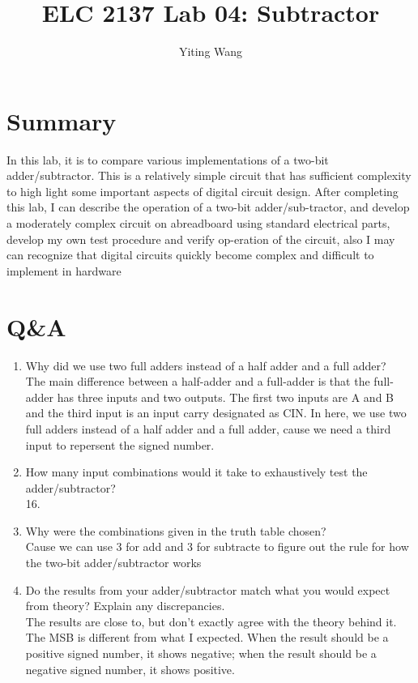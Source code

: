 \documentclass[11pt]{article}
\begin{document}
\title{ELC 2137 Lab 04: Subtractor}
\author{Yiting Wang}

\maketitle


\section*{Summary}

	In this lab, it is to compare various implementations of a two-bit adder/subtractor. This is a relatively simple circuit that has sufficient complexity to high light some important aspects of digital circuit design. After completing this lab, I can describe the operation of a two-bit adder/sub-tractor, and develop a moderately complex circuit on abreadboard using standard electrical parts, develop my own test procedure and verify op-eration of the circuit, also I may can recognize that digital circuits quickly become complex and difficult to implement in hardware



\section*{Q\&A}

	\begin{enumerate}
		\item Why did we use two full adders instead of a half adder and a full adder?\\
			The main difference between a half-adder and a full-adder is that the full-adder has three inputs and two outputs. The first two inputs are A and B and the third input is an input carry designated as CIN. In here, we use two full adders instead of a half adder and a full adder, cause we need a third input to repersent the signed number.\\
			
		\item How many input combinations would it take to exhaustively test the adder/subtractor?\\
			16.\\
			
		\item Why were the combinations given in the truth table chosen?\\
			Cause we can use 3 for add and 3 for subtracte to figure out the rule for how the two-bit adder/subtractor works\\
		
		\item Do the results from your adder/subtractor match what you would expect from theory? Explain any discrepancies.\\
			The results are close to, but don’t exactly agree with the theory behind it. The MSB is different from what I expected. When the result should be a positive signed number, it shows negative; when the result should be a negative signed number, it shows positive.\\
		
	\end{enumerate}
\end{document}
